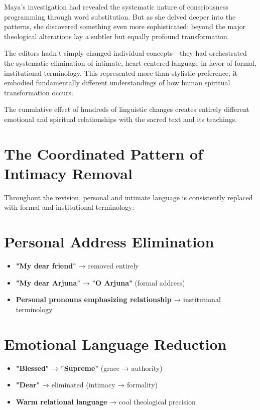 \documentclass[11pt,twoside]{book}
\begin{document}
\normalfont\justifying
Maya's investigation had revealed the systematic nature of consciousness programming through word substitution. But as she delved deeper into the patterns, she discovered something even more sophisticated: beyond the major theological alterations lay a subtler but equally profound transformation.

The editors hadn't simply changed individual concepts—they had orchestrated the systematic elimination of intimate, heart-centered language in favor of formal, institutional terminology. This represented more than stylistic preference; it embodied fundamentally different understandings of how human spiritual transformation occurs.

The cumulative effect of hundreds of linguistic changes creates entirely different emotional and spiritual relationships with the sacred text and its teachings.
\section*{The Coordinated Pattern of Intimacy Removal}
\label{sec:orgd598110}

Throughout the revision, personal and intimate language is consistently replaced with formal and institutional terminology:
\section*{Personal Address Elimination}
\label{sec:orgc862f20}
\begin{itemize}
\item \textbf{\textbf{"My dear friend"}} → removed entirely
\item \textbf{\textbf{"My dear Arjuna"}} → \textbf{\textbf{"O Arjuna"}} (formal address)
\item \textbf{\textbf{Personal pronouns emphasizing relationship}} → institutional terminology
\end{itemize}
\section*{Emotional Language Reduction}
\label{sec:org289a9c1}
\begin{itemize}
\item \textbf{\textbf{"Blessed"}} → \textbf{\textbf{"Supreme"}} (grace → authority)
\item \textbf{\textbf{"Dear"}} → eliminated (intimacy → formality)
\item \textbf{\textbf{Warm relational language}} → cool theological precision
\end{itemize}
\end{document}
